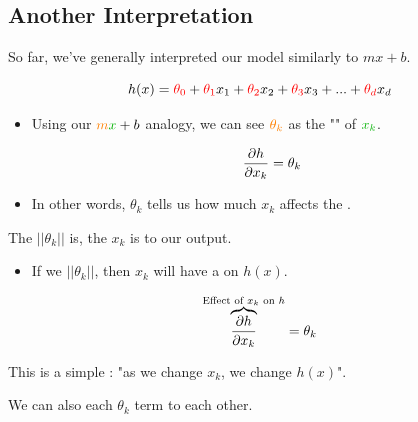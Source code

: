         
    \subsection{Another Interpretation}
    
        So far, we've generally interpreted our model similarly to $mx+b$.
        
        \begin{equation}
            h(x) = \textcolor{red}{\theta_0} + \textcolor{red}{\theta_1}x_1 + \textcolor{red}{\theta_2}x_2 + \textcolor{red}{\theta_3}x_3 + ... + \textcolor{red}{\theta_d}x_d
        \end{equation}

        \begin{itemize}
            \item Using our $\org{m}\grn{x}+b$ analogy, we can see $\textcolor{orange}{\theta_k}$ as the "" of $\grn{x_k}$.

            \begin{equation}
                \frac{\partial h}{\partial x_k} = \theta_k
            \end{equation}
            
            \item In other words, $\theta_k$ tells us how much $x_k$ affects the .\\
        \end{itemize}

        \begin{concept}
            The  $||\theta_k||$ is, the  $x_k$ is to our output. 
            

            \begin{itemize}
                \item If we  $||\theta_k||$, then $x_k$ will have a  on $h(x)$.
            \end{itemize}

            \begin{equation*}
                \overbrace{
                \frac{\partial h}{\partial x_k}
                }^{\text{Effect of $x_k$ on $h$}}= 
                \theta_k
            \end{equation*}

            This is a simple : "as we change $x_k$, we change $h(x)$".
        \end{concept}

        We can also  each $\theta_k$ term to each other. 

